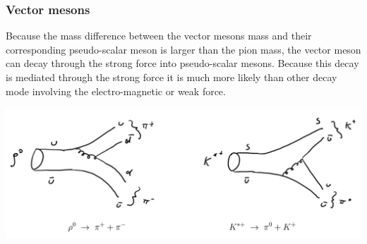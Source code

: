\documentclass[12pt]{article}
\begin{document}
\subsubsection{Vector mesons}
Because the mass difference between the vector mesons mass and their corresponding pseudo-scalar meson is larger than the pion mass, the vector meson can decay through the strong force into pseudo-scalar mesons. Because this decay is mediated through the strong force it is much more likely than other decay mode involving the electro-magnetic or weak force. 
\begin{center}
\includegraphics[scale=0.2]{images/vectorMesonsDecay.png}
\end{center}
   
\end{document}
